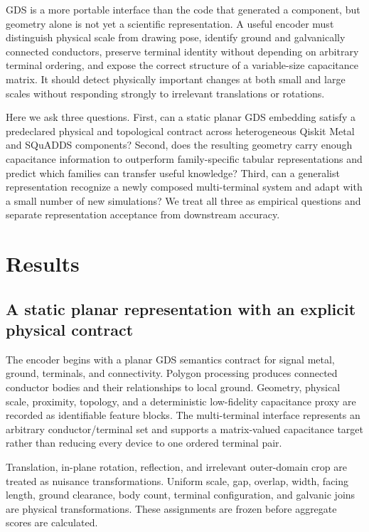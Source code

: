 \documentclass[11pt]{article}
\newcommand{\squadds}{SQuADDS}
\begin{document}
GDS is a more portable interface than the code that generated a component, but
geometry alone is not yet a scientific representation. A useful encoder must
distinguish physical scale from drawing pose, identify ground and galvanically
connected conductors, preserve terminal identity without depending on arbitrary
terminal ordering, and expose the correct structure of a variable-size
capacitance matrix. It should detect physically important changes at both small
and large scales without responding strongly to irrelevant translations or
rotations.

Here we ask three questions. First, can a static planar GDS embedding satisfy a
predeclared physical and topological contract across heterogeneous Qiskit Metal
and \squadds{} components? Second, does the resulting geometry carry enough
capacitance information to outperform family-specific tabular representations
and predict which families can transfer useful knowledge? Third, can a
generalist representation recognize a newly composed multi-terminal system and
adapt with a small number of new simulations? We treat all three as empirical
questions and separate representation acceptance from downstream accuracy.

\section*{Results}

\subsection*{A static planar representation with an explicit physical contract}
The encoder begins with a planar GDS semantics contract for signal metal,
ground, terminals, and connectivity. Polygon processing produces connected
conductor bodies and their relationships to local ground. Geometry, physical
scale, proximity, topology, and a deterministic low-fidelity capacitance proxy
are recorded as identifiable feature blocks. The multi-terminal interface
represents an arbitrary conductor/terminal set and supports a matrix-valued
capacitance target rather than reducing every device to one ordered terminal
pair.

Translation, in-plane rotation, reflection, and irrelevant outer-domain crop
are treated as nuisance transformations. Uniform scale, gap, overlap, width,
facing length, ground clearance, body count, terminal configuration, and
galvanic joins are physical transformations. These assignments are frozen
before aggregate scores are calculated.
\end{document}
